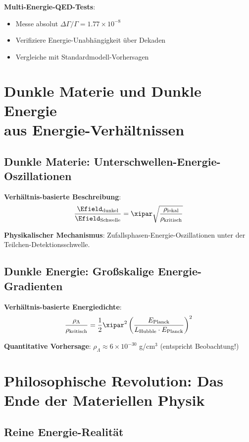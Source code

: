 	\textbf{Multi-Energie-QED-Tests}:
	\begin{itemize}
		\item Messe absolut $\Delta\Gamma/\Gamma = 1.77 \times 10^{-8}$
		\item Verifiziere Energie-Unabhängigkeit über Dekaden
		\item Vergleiche mit Standardmodell-Vorhersagen
	\end{itemize}
	
	\section{Dunkle Materie und Dunkle Energie\\ aus Energie-Verhältnissen}
	
	\subsection{Dunkle Materie: Unterschwellen-Energie-Oszillationen}
	
	\textbf{Verhältnis-basierte Beschreibung}:
	\begin{equation}
		\frac{\Efield_{\text{dunkel}}}{\Efield_{\text{Schwelle}}} = \xipar \sqrt{\frac{\rho_{\text{lokal}}}{\rho_{\text{kritisch}}}}
	\end{equation}
	
	\textbf{Physikalischer Mechanismus}: Zufallsphasen-Energie-Oszillationen unter der Teilchen-Detektionsschwelle.
	
	\subsection{Dunkle Energie: Großskalige Energie-Gradienten}
	
	\textbf{Verhältnis-basierte Energiedichte}:
	\begin{equation}
		\frac{\rho_{\Lambda}}{\rho_{\text{kritisch}}} = \frac{1}{2} \xipar^2 \left(\frac{E_{\text{Planck}}}{L_{\text{Hubble}} \cdot E_{\text{Planck}}}\right)^2
	\end{equation}
	
	\textbf{Quantitative Vorhersage}: $\rho_{\Lambda} \approx 6 \times 10^{-30}$ g/cm$^3$ (entspricht Beobachtung!)
	
	\section{Philosophische Revolution: Das Ende der Materiellen Physik}
	
	\subsection{Reine Energie-Realität}
	
